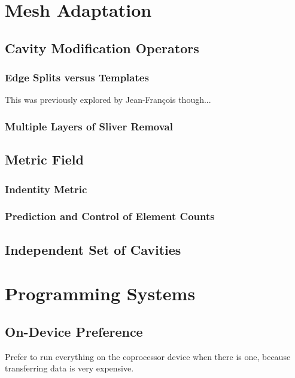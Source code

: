 \section{Mesh Adaptation}

\subsection{Cavity Modification Operators}

\subsubsection{Edge Splits versus Templates}

This was previously explored by Jean-Fran\c{c}ois though...

\subsubsection{Multiple Layers of Sliver Removal}

\subsection{Metric Field}

\subsubsection{Indentity Metric}

\subsubsection{Prediction and Control of Element Counts}

\subsection{Independent Set of Cavities}

\section{Programming Systems}

\subsection{On-Device Preference}

Prefer to run everything on the coprocessor device
when there is one, because transferring data
is very expensive.

